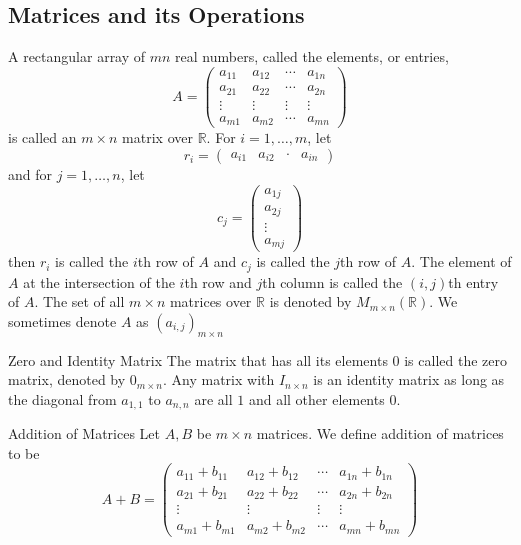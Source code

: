 \documentclass[a4paper]{article}
\begin{document}
\subsection{Matrices and its Operations}
\begin{defn}{}{} A rectangular array of $mn$ real numbers, called the elements, or entries, $$A=
\begin{pmatrix}
a_{11}&a_{12}&\cdots&a_{1n}\\
a_{21}&a_{22}&\cdots&a_{2n}\\
\vdots&\vdots&\vdots&\vdots\\
a_{m1}&a_{m2}&\cdots&a_{mn}
\end{pmatrix}$$ is called an $m\times n$ matrix over $\mathbb{R}$. For $i=1,\dots,m$, let $$r_i=
\begin{pmatrix}
a_{i1}&a_{i2}&\cdot&a_{in}
\end{pmatrix}$$ and for $j=1,\dots,n$, let $$c_j=
\begin{pmatrix}
a_{1j}\\
a_{2j}\\
\vdots\\
a_{mj}
\end{pmatrix}$$ then $r_i$ is called the $i$th row of $A$ and $c_j$ is called the $j$th row of $A$. The element of $A$ at the intersection of the $i$th row and $j$th column is called the $(i,j)$th entry of $A$. The set of all $m\times n$ matrices over $\mathbb{R}$ is denoted by $M_{m\times n}(\mathbb{R})$. We sometimes denote $A$ as $(a_{i,j})_{m\times n}$
\end{defn}

\begin{defn}{Zero and Identity Matrix}{} The matrix that has all its elements $0$ is called the zero matrix, denoted by $0_{m\times n}$. Any matrix with $I_{n\times n}$ is an identity matrix as long as the diagonal from $a_{1,1}$ to $a_{n,n}$ are all $1$ and all other elements $0$. 
\end{defn}

\begin{defn}{Addition of Matrices}{} Let $A,B$ be $m\times n$ matrices. We define addition of matrices to be $$A+B=
\begin{pmatrix}
a_{11}+b_{11}&a_{12}+b_{12}&\cdots&a_{1n}+b_{1n}\\
a_{21}+b_{21}&a_{22}+b_{22}&\cdots&a_{2n}+b_{2n}\\
\vdots&\vdots&\vdots&\vdots\\
a_{m1}+b_{m1}&a_{m2}+b_{m2}&\cdots&a_{mn}+b_{mn}
\end{pmatrix}$$
\end{defn}
\end{document}
